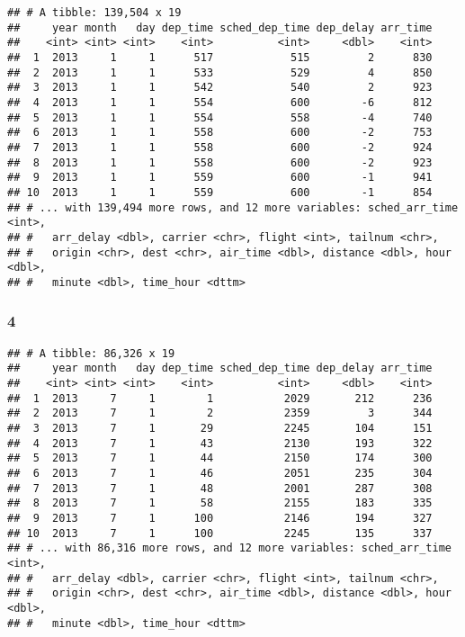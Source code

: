 \documentclass[]{article}
\newenvironment{Shaded}{\begin{snugshade}}{\end{snugshade}}
\newcommand{\DecValTok}[1]{\textcolor[rgb]{0.00,0.00,0.81}{#1}}
\newcommand{\KeywordTok}[1]{\textcolor[rgb]{0.13,0.29,0.53}{\textbf{#1}}}
\newcommand{\NormalTok}[1]{#1}
\newcommand{\OperatorTok}[1]{\textcolor[rgb]{0.81,0.36,0.00}{\textbf{#1}}}
\newcommand{\StringTok}[1]{\textcolor[rgb]{0.31,0.60,0.02}{#1}}
\begin{document}
\begin{verbatim}
## # A tibble: 139,504 x 19
##     year month   day dep_time sched_dep_time dep_delay arr_time
##    <int> <int> <int>    <int>          <int>     <dbl>    <int>
##  1  2013     1     1      517            515         2      830
##  2  2013     1     1      533            529         4      850
##  3  2013     1     1      542            540         2      923
##  4  2013     1     1      554            600        -6      812
##  5  2013     1     1      554            558        -4      740
##  6  2013     1     1      558            600        -2      753
##  7  2013     1     1      558            600        -2      924
##  8  2013     1     1      558            600        -2      923
##  9  2013     1     1      559            600        -1      941
## 10  2013     1     1      559            600        -1      854
## # ... with 139,494 more rows, and 12 more variables: sched_arr_time <int>,
## #   arr_delay <dbl>, carrier <chr>, flight <int>, tailnum <chr>,
## #   origin <chr>, dest <chr>, air_time <dbl>, distance <dbl>, hour <dbl>,
## #   minute <dbl>, time_hour <dttm>
\end{verbatim}

\hypertarget{section-5}{%
\subsubsection{4}\label{section-5}}

\begin{Shaded}
\end{Shaded}

\begin{verbatim}
## # A tibble: 86,326 x 19
##     year month   day dep_time sched_dep_time dep_delay arr_time
##    <int> <int> <int>    <int>          <int>     <dbl>    <int>
##  1  2013     7     1        1           2029       212      236
##  2  2013     7     1        2           2359         3      344
##  3  2013     7     1       29           2245       104      151
##  4  2013     7     1       43           2130       193      322
##  5  2013     7     1       44           2150       174      300
##  6  2013     7     1       46           2051       235      304
##  7  2013     7     1       48           2001       287      308
##  8  2013     7     1       58           2155       183      335
##  9  2013     7     1      100           2146       194      327
## 10  2013     7     1      100           2245       135      337
## # ... with 86,316 more rows, and 12 more variables: sched_arr_time <int>,
## #   arr_delay <dbl>, carrier <chr>, flight <int>, tailnum <chr>,
## #   origin <chr>, dest <chr>, air_time <dbl>, distance <dbl>, hour <dbl>,
## #   minute <dbl>, time_hour <dttm>
\end{verbatim}
\end{document}

